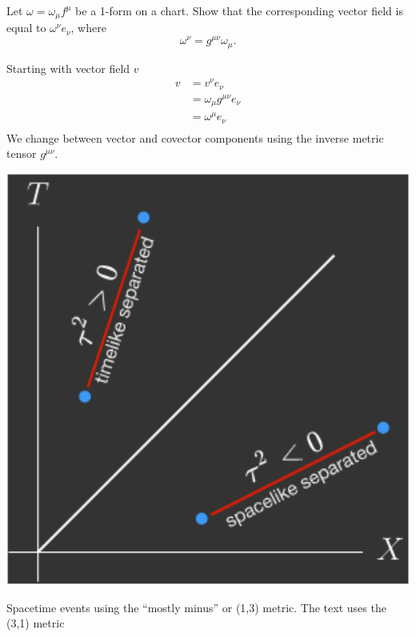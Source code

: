 \documentclass[10pt]{article}
\begin{document}
\begin{example}\label{b1e54}
	Let $\omega=\omega_\mu f^\mu$ be a 1-form on a chart. Show that the corresponding vector field is equal to $\omega^\nu e_\nu$, where
	$$
		\omega^\nu = g^{\mu\nu}\omega_\mu.
	$$
\end{example}
\sol Starting with vector field $v$
$$ 
\begin{aligned}
	v &= v^\nu e_\nu\\
	&= \omega_\mu g^{\mu\nu} e_\nu\\
	&= \omega^\mu e_\nu\\
\end{aligned}
$$
We change between vector and covector components using the inverse metric tensor $g^{\mu\nu}$.	\begin{marginfigure}
	\begin{center}
	  \includegraphics[width=1.2\textwidth]{figs/metric.png}
	\end{center}
	\caption{Spacetime events using the ``mostly minus'' or (1,3) metric. The text uses the (3,1) metric}
\end{marginfigure}	
\end{document}
